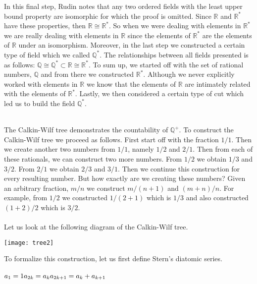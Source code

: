 \documentclass[12pt]{article}
\begin{document}
In this final step, Rudin notes that any two ordered fields with the least upper bound property are isomorphic for which the proof is omitted. Since $\mathbb{R}$ and $\mathbb{R}^{*}$ have these properties, then $\mathbb{R} \cong \mathbb{R}^{*}$. So when we were dealing with elements in $\mathbb{R}^{*}$ we are really dealing with elements in $\mathbb{R}$ since the elements of $\mathbb{R}^{*}$ are  the elements of $\mathbb{R}$ under an isomorphism. Moreover, in the last step we constructed a certain type of field which we called $\mathbb{Q}^{*}$. The relationships between all fields presented is as follows: $\mathbb{Q} \cong \mathbb{Q}^{*} \subset \mathbb{R} \cong \mathbb{R}^{*}$. To sum up, we started off with the set of rational numbers, $\mathbb{Q}$ and from there we constructed $\mathbb{R}^{*}$. Although we never explicitly worked with elements in $\mathbb{R}$ we know that the elements of $\mathbb{R}$ are intimately related with the elements of $\mathbb{R}^{*}.$ Lastly, we then considered a certain type of cut which led us to build the field $\mathbb{Q}^{*}$. \\ \\

\problem 

\noindent The Calkin-Wilf tree demonstrates the countability of $\mathbb{Q}^{+}$. To construct the Calkin-Wilf tree we proceed as follows. First start off with the fraction $1/1$. Then we create another two numbers from $1/1$, namely $1/2$ and $2/1$. Then from each of these rationals, we can construct two more numbers. From $1/2$ we obtain $1/3$ and $3/2$. From $2/1$ we obtain $2/3$ and $3/1$. Then we continue this construction for every resulting number. But how exactly are we creating these numbers? Given an arbitrary fraction, $m/n$ we construct $m/(n+1)$ and $(m+n)/n$. For example, from $1/2$ we constructed $1/(2+1)$ which is $1/3$ and also constructed $(1+2)/2$ which is $3/2$. \\ \\ 

\noindent Let us look at the following diagram of the Calkin-Wilf tree.  \\ 

\centerline{\texttt{[image: tree2]}} 

\noindent To formalize this construction, let us first define Stern's diatomic series. \\ \\
$a_{1}=1 \\ 
a_{2k}=a_{k} \\ 
a_{2k+1}=a_{k}+a_{k+1}$ \\
\end{document}
